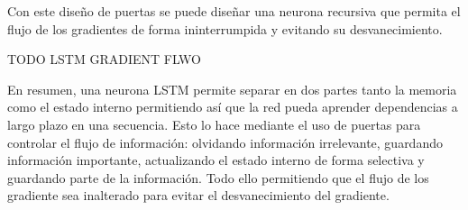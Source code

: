 Con este diseño de puertas se puede diseñar una neurona recursiva que permita el flujo de los gradientes de forma ininterrumpida y evitando su desvanecimiento.

TODO LSTM GRADIENT FLWO
 
 En resumen, una neurona LSTM permite separar en dos partes tanto la memoria como el estado interno permitiendo así que la red pueda aprender dependencias a largo plazo en una secuencia. Esto lo hace mediante el uso de puertas para controlar el flujo de información: olvidando información irrelevante, guardando información importante, actualizando el estado interno de forma selectiva y guardando parte de la información. Todo ello permitiendo que el flujo de los gradiente sea inalterado para evitar el desvanecimiento del gradiente.